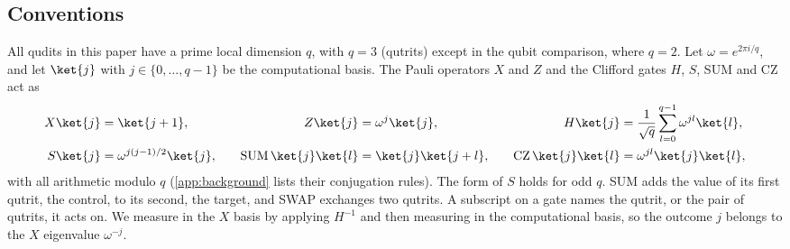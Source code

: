 \subsection{Conventions}
\label{sub:conventions}

All qudits in this paper have a prime local dimension $q$, with $q = 3$ (qutrits) except in the qubit comparison, where $q = 2$. Let $\omega = e^{2\pi i/q}$, and let $\ket{j}$ with $j \in \{0, \dots, q-1\}$ be the computational basis. The Pauli operators $X$ and $Z$ and the Clifford gates $H$, $S$, SUM and CZ act as
\begin{equation}
  \begin{aligned}
    X\ket{j} &= \ket{j+1}, &\quad Z\ket{j} &= \omega^{j}\ket{j}, &\quad H\ket{j} &= \frac{1}{\sqrt{q}}\sum_{l=0}^{q-1}\omega^{jl}\ket{l}, \\
    S\ket{j} &= \omega^{j(j-1)/2}\ket{j}, &\quad \mathrm{SUM}\,\ket{j}\ket{l} &= \ket{j}\ket{j+l}, &\quad \mathrm{CZ}\,\ket{j}\ket{l} &= \omega^{jl}\ket{j}\ket{l},
  \end{aligned}
  \label{eq:conventions}
\end{equation}
with all arithmetic modulo $q$ (\autoref{app:background} lists their conjugation rules). The form of $S$ holds for odd $q$. SUM adds the value of its first qutrit, the control, to its second, the target, and SWAP exchanges two qutrits. A subscript on a gate names the qutrit, or the pair of qutrits, it acts on. We measure in the $X$ basis by applying $H^{-1}$ and then measuring in the computational basis, so the outcome $j$ belongs to the $X$ eigenvalue $\omega^{-j}$.

